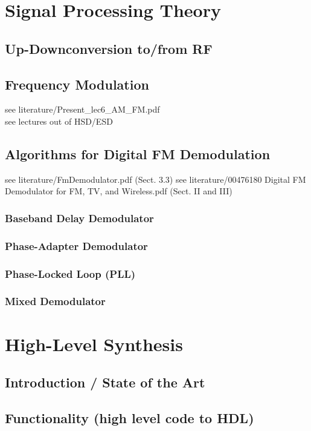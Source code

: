 \chapter{Signal Processing Theory}
\label{cha:TheThesis}

  \section{Up-Downconversion to/from RF}

  \section{Frequency Modulation}
  see literature/Present\_lec6\_AM\_FM.pdf\\
  see lectures out of HSD/ESD

  \section{Algorithms for Digital FM Demodulation}
    see literature/FmDemodulator.pdf (Sect. 3.3)
    see literature/00476180 Digital FM Demodulator for FM, TV, and Wireless.pdf (Sect. II and III)

    \subsection{Baseband Delay Demodulator}
    \subsection{Phase-Adapter Demodulator}
    \subsection{Phase-Locked Loop (PLL)}
    \subsection{Mixed Demodulator}


\chapter{High-Level Synthesis}
  \section{Introduction / State of the Art}
  \section{Functionality (high level code to HDL)}
